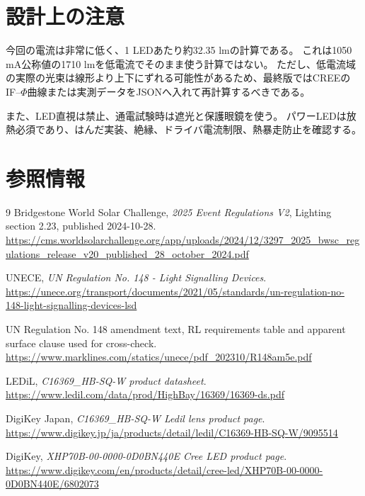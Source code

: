 \documentclass[11pt,a4paper]{article}
\begin{document}
\section{設計上の注意}
今回の電流は非常に低く、1 LEDあたり約32.35 lmの計算である。
これは1050 mA公称値の1710 lmを低電流でそのまま使う計算ではない。
ただし、低電流域の実際の光束は線形より上下にずれる可能性があるため、最終版ではCREEのIF--$\Phi$曲線または実測データをJSONへ入れて再計算するべきである。

また、LED直視は禁止、通電試験時は遮光と保護眼鏡を使う。
パワーLEDは放熱必須であり、はんだ実装、絶縁、ドライバ電流制限、熱暴走防止を確認する。

\section{参照情報}
\begin{thebibliography}{9}
Bridgestone World Solar Challenge, \emph{2025 Event Regulations V2}, Lighting section 2.23, published 2024-10-28.
\url{https://cms.worldsolarchallenge.org/app/uploads/2024/12/3297_2025_bwsc_regulations_release_v20_published_28_october_2024.pdf}

UNECE, \emph{UN Regulation No. 148 - Light Signalling Devices}.
\url{https://unece.org/transport/documents/2021/05/standards/un-regulation-no-148-light-signalling-devices-lsd}

UN Regulation No. 148 amendment text, RL requirements table and apparent surface clause used for cross-check.
\url{https://www.marklines.com/statics/unece/pdf_202310/R148am5e.pdf}

LEDiL, \emph{C16369\_HB-SQ-W product datasheet}.
\url{https://www.ledil.com/data/prod/HighBay/16369/16369-ds.pdf}

DigiKey Japan, \emph{C16369\_HB-SQ-W Ledil lens product page}.
\url{https://www.digikey.jp/ja/products/detail/ledil/C16369-HB-SQ-W/9095514}

DigiKey, \emph{XHP70B-00-0000-0D0BN440E Cree LED product page}.
\url{https://www.digikey.com/en/products/detail/cree-led/XHP70B-00-0000-0D0BN440E/6802073}
\end{thebibliography}
\end{document}
